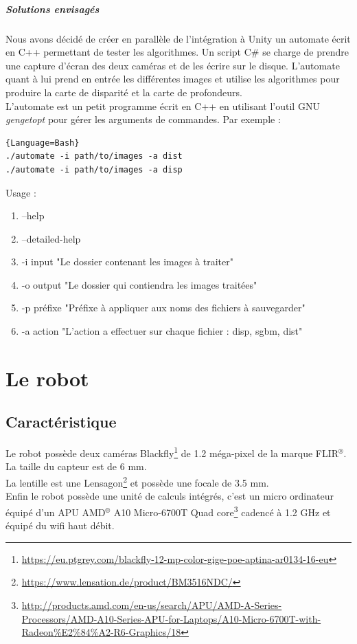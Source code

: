 \documentclass[12pt,a4paper]{report}
\begin{document}
\paragraph{Solutions envisagés}
Nous avons décidé de créer en parallèle de l'intégration à Unity un automate écrit en C++ permettant de tester les algorithmes. Un script C\# se charge de prendre une capture d'écran des deux caméras et de les écrire sur le disque. L'automate quant à lui prend en entrée les différentes images et utilise les algorithmes pour produire la carte de disparité et la carte de profondeurs.\\
L'automate est un petit programme écrit en C++ en utilisant l'outil GNU \textit{gengetopt} pour gérer les arguments de commandes. Par exemple :\\

\begin{lstlisting}{Language=Bash}
./automate -i path/to/images -a dist
./automate -i path/to/images -a disp
\end{lstlisting}

Usage :
\begin{enumerate}
\item[] --help
\item[] --detailed-help
\item[] -i input "Le dossier contenant les images à traiter"
\item[] -o output "Le dossier qui contiendra les images traitées"
\item[] -p préfixe "Préfixe à appliquer aux noms des fichiers à sauvegarder"
\item[] -a action "L'action a effectuer sur chaque fichier : disp, sgbm, dist"
\end{enumerate}

\chapter{Le robot}

\section{Caractéristique}
Le robot possède deux caméras Blackfly\footnote{\url{https://eu.ptgrey.com/blackfly-12-mp-color-gige-poe-aptina-ar0134-16-eu}} de 1.2 méga-pixel de la marque FLIR$^{\text{®}}$. La taille du capteur est de 6 mm.\\
La lentille est une Lensagon\footnote{\url{https://www.lensation.de/product/BM3516NDC/}} et possède une focale de 3.5 mm. 
\\Enfin le robot possède une unité de calculs intégrés, c'est un micro ordinateur équipé d'un APU AMD$^{\text{®}}$ A10 Micro-6700T Quad core\footnote{\url{http://products.amd.com/en-us/search/APU/AMD-A-Series-Processors/AMD-A10-Series-APU-for-Laptops/A10-Micro-6700T-with-Radeon\%E2\%84\%A2-R6-Graphics/18}}  cadencé à 1.2 GHz et équipé du wifi haut débit.
\end{document}
